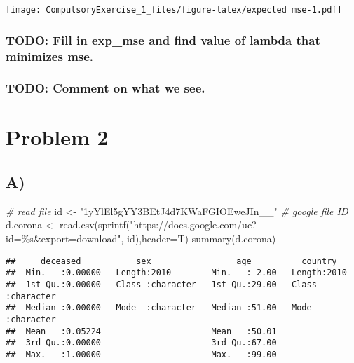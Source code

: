 \documentclass[
]{article}
\newenvironment{Shaded}{\begin{snugshade}}{\end{snugshade}}
\newcommand{\AttributeTok}[1]{\textcolor[rgb]{0.77,0.63,0.00}{#1}}
\newcommand{\CommentTok}[1]{\textcolor[rgb]{0.56,0.35,0.01}{\textit{#1}}}
\newcommand{\FunctionTok}[1]{\textcolor[rgb]{0.00,0.00,0.00}{#1}}
\newcommand{\NormalTok}[1]{#1}
\newcommand{\OtherTok}[1]{\textcolor[rgb]{0.56,0.35,0.01}{#1}}
\newcommand{\StringTok}[1]{\textcolor[rgb]{0.31,0.60,0.02}{#1}}
\begin{document}
\texttt{[image: CompulsoryExercise\_1\_files/figure-latex/expected mse-1.pdf]}

\hypertarget{todo-fill-in-exp_mse-and-find-value-of-lambda-that-minimizes-mse.}{%
\subsubsection{TODO: Fill in exp\_mse and find value of lambda that
minimizes
mse.}\label{todo-fill-in-exp_mse-and-find-value-of-lambda-that-minimizes-mse.}}

\hypertarget{todo-comment-on-what-we-see.}{%
\subsubsection{TODO: Comment on what we
see.}\label{todo-comment-on-what-we-see.}}

\hypertarget{problem-2}{%
\section{Problem 2}\label{problem-2}}

\hypertarget{a-1}{%
\subsection{A)}\label{a-1}}

\begin{Shaded}
\begin{Highlighting}[]
\CommentTok{\# read file}
\NormalTok{id }\OtherTok{\textless{}{-}} \StringTok{"1yYlEl5gYY3BEtJ4d7KWaFGIOEweJIn\_\_"} \CommentTok{\# google file ID}
\NormalTok{d.corona }\OtherTok{\textless{}{-}} \FunctionTok{read.csv}\NormalTok{(}\FunctionTok{sprintf}\NormalTok{(}\StringTok{"https://docs.google.com/uc?id=\%s\&export=download"}\NormalTok{, id),}\AttributeTok{header=}\NormalTok{T)}
\FunctionTok{summary}\NormalTok{(d.corona)}
\end{Highlighting}
\end{Shaded}

\begin{verbatim}
##     deceased           sex                 age          country         
##  Min.   :0.00000   Length:2010        Min.   : 2.00   Length:2010       
##  1st Qu.:0.00000   Class :character   1st Qu.:29.00   Class :character  
##  Median :0.00000   Mode  :character   Median :51.00   Mode  :character  
##  Mean   :0.05224                      Mean   :50.01                     
##  3rd Qu.:0.00000                      3rd Qu.:67.00                     
##  Max.   :1.00000                      Max.   :99.00
\end{verbatim}
\end{document}
